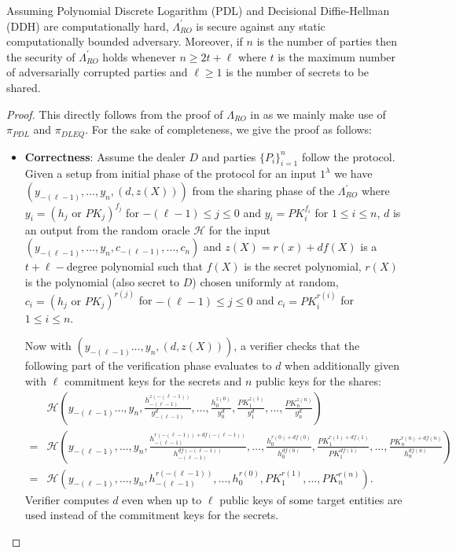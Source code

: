 \begin{theorem}\label{th:init-lambda_ro}
  Assuming Polynomial Discrete Logarithm (PDL) and Decisional Diffie-Hellman (DDH) are 
  computationally hard, $\Lambda_{RO}^{'}$ is secure against any 
  static computationally bounded adversary. Moreover, if $n$ is the number of parties then the 
  security of $\Lambda_{RO}^{'}$ holds whenever $n\geq 2t+\ell$ where $t$ is the maximum number of
  adversarially corrupted parties and $\ell\geq 1$ is the number of secrets to be shared.
\end{theorem}
\begin{proof}
  This directly follows from the proof of $\Lambda_{RO}$ in \cite{cryptoeprint:2025/576} as we mainly make use of 
  $\pi_{PDL}$ and $\pi_{DLEQ}$. For the sake of completeness, we give the proof as follows: 
  \begin{itemize}
    \item \textbf{Correctness}: Assume the dealer $D$ and parties $\{P_i\}_{i=1}^n$ follow the protocol. Given a 
    setup from initial phase of the protocol for an input $1^\lambda$ we have $(y_{-(\ell-1)},\dots,y_n,(d,z(X)))$ from 
    the sharing phase of the $\Lambda_{RO}^{'}$ where 
    $y_i=(h_j\text{ or }PK_j)^{f_j}$ for $-(\ell-1)\leq j\leq 0$ and $y_i=PK_i^{f_i}$ for $1\leq i\leq n$, 
    $d$ is an output 
    from the random oracle $\mathcal{H}$ for the input $(y_{-(\ell-1)},\dots,y_n,c_{-(\ell-1)},\dots,c_n)$ and $z(X)=r(x)+df(X)$ 
    is a $t+\ell-$degree polynomial such that $f(X)$ is the secret polynomial, $r(X)$ is the polynomial (also secret to $D$) 
    chosen uniformly at random, $c_i=(h_j\text{ or }PK_j)^{r(j)}$ for $-(\ell-1)\leq j\leq 0$ and 
    $c_i=PK_i^{r(i)}$ for $1\leq i\leq n$.\par 

    Now with $(y_{-(\ell-1)}\dots,y_n,(d,z(X)))$, a verifier checks that the following part of the verification phase evaluates to $d$ 
    when additionally given with $\ell$ commitment keys for the secrets and $n$ public keys for the shares:
    \begin{align*}
      &\mathcal{H}(y_{-(\ell-1)}\dots,y_n,\frac{h_{-(\ell-1)}^{z(-(\ell-1))}}{y_{-(\ell-1)}^d},\dots,\frac{h_0^{z(0)}}{y_0^d},\frac{PK_1^{z(1)}}{y_1^d},\dots,\frac{PK_n^{z(n)}}{y_n^d})\\
      =&\mathcal{H}(y_{-(\ell-1)},\dots,y_n,\frac{h_{-(\ell-1)}^{r(-(\ell-1))+df(-(\ell-1))}}{h_{-(\ell-1)}^{df(-(\ell-1))}},\dots,\frac{h_0^{r(0)+df(0)}}{h_0^{df(0)}},\frac{PK_1^{r(1)+df(1)}}{PK_1^{df(1)}},\dots,\frac{PK_n^{r(n)+df(n)}}{h_n^{df(n)}})\\
      =&\mathcal{H}(y_{-(\ell-1)},\dots,y_n,h_{-(\ell-1)}^{r(-(\ell-1))},\dots,h_0^{r(0)},PK_1^{r(1)},\dots,PK_n^{r(n)}).
    \end{align*}
    Verifier computes $d$ even when up to $\ell$ public keys of some target entities are used instead of the commitment 
    keys for the secrets.\par 
    

\end{itemize}
\end{proof}
